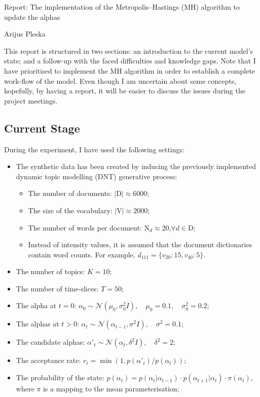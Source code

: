 \documentclass[12pt]{article}
\begin{document}
\begingroup  
  \centering
  \large Report: The implementation of the Metropolis--Hastings (MH) algorithm to update the alphas \par
  \large Arijus Pleska \par
\endgroup

\par This report is structured in two sections: an introduction to the current model's state; and a follow-up with the faced difficulties and knowledge gaps. Note that I have prioritised to implement the MH algorithm in order to establish a complete work-flow of the model. Even though I am uncertain about some concepts, hopefully, by having a report, it will be easier to discuss the issues during the project meetings.

\subsection*{Current Stage}


\par During the experiment, I have used the following settings:
\begin{itemize}
\item The synthetic data has been created by inducing the previously implemented dynamic topic modelling (DNT) generative process:
\begin{itemize}
\item The number of documents: $|\mbox{D}|\approx6000$;
\item The size of the vocabulary: $|\mbox{V}|\approx2000$;
\item The number of words per document: $\mbox{N}_d\approx20$,\quad$\forall d \in \mbox{D}$;
\item Instead of intensity values, it is assumed that the document dictionaries contain word counts. For example, $d_{111}=\{v_{20}:15, v_{40}:5\}$. 
\end{itemize}
\item The number of topics: $K=10$;
\item The number of time-slices: $T=50$;
\item The alpha at $t=0$: $\alpha_0 \sim \mathcal{N}(\mu_0, \sigma^2_0I),\quad \mu_0 = 0.1,\quad\sigma_0^2 = 0.2$;
\item The alphas at $t>0$: $\alpha_t \sim \mathcal{N}(\alpha_{t-1}, \sigma^2I), \quad\sigma^2 = 0.1$;
\item The candidate alphas: $\alpha'_t \sim \mathcal{N}(\alpha_{t}, \delta^2I), \quad\delta^2 = 2$; 
\item The acceptance rate: $r_t=\min(1,p(\alpha'_t)/p(\alpha_t))$;
\item The probability of the state: $p(\alpha_t)=p(\alpha_{t} | \alpha_{t-1})\cdot p(\alpha_{t+1} | \alpha_{t})\cdot \pi(\alpha_t)$, where $\pi$ is a mapping to the mean parameterisation;
\end{itemize}
\end{document}
